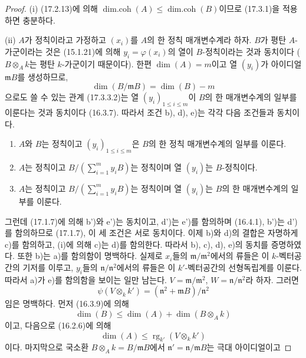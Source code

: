 \begin{proof}
\textnormal{(i)} (17.2.13)에 의해
$\operatorname{dim.coh}(A)\leq\operatorname{dim.coh}(B)$이므로
(17.3.1)을 적용하면 충분하다.

\textnormal{(ii)} $A$가 정칙이라고 가정하고 $(x_i)$를 $A$의 한 정칙
매개변수계라 하자. $B$가 평탄 $A$-가군이라는 것은 (15.1.21)에 의해
$y_i=\varphi(x_i)$의 열이 $B$-정칙이라는 것과 동치이다
($B\otimes_A k$는 평탄 $k$-가군이기 때문이다). 한편
$\dim(A)=m$이고 열 $(y_i)$가 아이디얼 $\mathfrak{m}B$를 생성하므로,
\[
  \dim(B/\mathfrak{m}B)=\dim(B)-m
\]
으로도 쓸 수 있는 관계 (17.3.3.2)는 열
$(y_i)_{1\leq i\leq m}$이 $B$의 한 매개변수계의 일부를 이룬다는 것과
동치이다 (16.3.7). 따라서 조건 b), d), e)는 각각 다음 조건들과
동치이다.
\begin{enumerate}
  \item[\rm b')] $A$와 $B$는 정칙이고 $(y_i)_{1\leq i\leq m}$은
  $B$의 한 정칙 매개변수계의 일부를 이룬다.
  \item[\rm d')] $A$는 정칙이고
  $B/(\sum_{i=1}^m y_iB)$는 정칙이며 열 $(y_i)$는 $B$-정칙이다.
  \item[\rm e')] $A$는 정칙이고
  $B/(\sum_{i=1}^m y_iB)$는 정칙이며 열 $(y_i)$는 $B$의 한
  매개변수계의 일부를 이룬다.
\end{enumerate}
그런데 (17.1.7)에 의해 b')와 e')는 동치이고, d')는 e')를 함의하며
(16.4.1), b')는 d')를 함의하므로 (17.1.7), 이 세 조건은 서로
동치이다. 이제
b)와 d)의 결합은 자명하게 c)를 함의하고,
(i)에 의해 c)는 d)를 함의한다. 따라서 b), c), d), e)의 동치를
증명하였다. 또한 b)는 a)를 함의함이 명백하다. 실제로 $x_i$들의
$\mathfrak{m}/\mathfrak{m}^2$에서의 류들은 이 $k$-벡터공간의
기저를 이루고, $y_i$들의 $\mathfrak{n}/\mathfrak{n}^2$에서의
류들은 이 $k'$-벡터공간의 선형독립계를 이룬다. 따라서 a)가
e)를 함의함을 보이는 일만 남는다. $V=\mathfrak{m}/\mathfrak{m}^2$,
$W=\mathfrak{n}/\mathfrak{n}^2$라 하자. 그러면
\[
  \psi(V\otimes_k k')=(\mathfrak{n}^2+\mathfrak{m}B)/\mathfrak{n}^2
\]
임은 명백하다. 먼저 (16.3.9)에 의해
\begin{equation}
\label{0.17.3.3.3-fr}
\tag{17.3.3.3}
  \dim(B)\leq\dim(A)+\dim(B\otimes_A k)
\end{equation}
이고, 다음으로 (16.2.6)에 의해
\begin{equation}
\label{0.17.3.3.4-fr}
\tag{17.3.3.4}
  \dim(A)\leq\operatorname{rg}_{k'}(V\otimes_k k')
\end{equation}
이다. 마지막으로 국소환 $B\otimes_A k=B/\mathfrak{m}B$에서
$\mathfrak{n}'=\mathfrak{n}/\mathfrak{m}B$는 극대 아이디얼이고

\end{proof}
